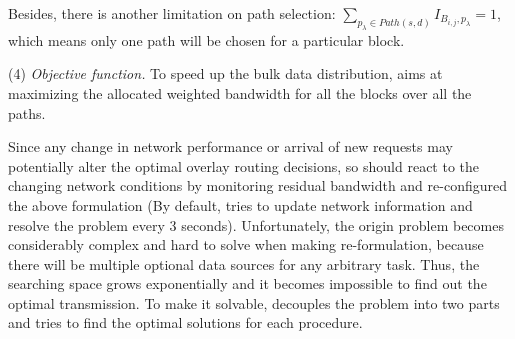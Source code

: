 Besides, there is another limitation on path selection: $\displaystyle{\sum_{p_\lambda \in Path(s,d)}} I_{B_{i,j},p_\lambda} = 1$, which means only one path will be chosen for a particular block.


\noindent(4) {\em Objective function.} To speed up the bulk data distribution, \name aims at maximizing the allocated weighted bandwidth for all the blocks over all the paths.

Since any change in network performance or arrival of
new requests may potentially alter the optimal overlay
routing decisions,
so \name should react to the changing network conditions by monitoring residual bandwidth and re-configured the above formulation (By default, \name tries to update network information and resolve the problem every 3 seconds). Unfortunately, the origin problem becomes considerably complex and hard to solve when making re-formulation, because there will be multiple optional data sources for any arbitrary task. Thus, the searching space grows exponentially and it becomes impossible to find out the optimal transmission. To make it solvable, \name decouples the problem into two parts and tries to find the optimal solutions for each procedure.

